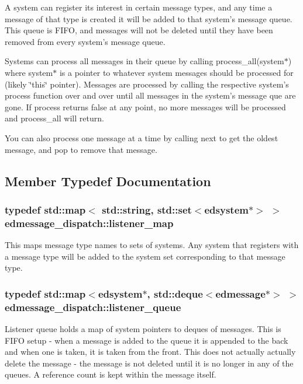 A system can register its interest in certain message types, and any time a message of that type is created it will be added to that system's message queue. This queue is F\-I\-F\-O, and messages will not be deleted until they have been removed from every system's message queue.

Systems can process all messages in their queue by calling process\-\_\-all(system$\ast$) where system$\ast$ is a pointer to whatever system messages should be processed for (likely \char`\"{}this\char`\"{} pointer). Messages are processed by calling the respective system's process function over and over until all messages in the system's message que are gone. If process returns false at any point, no more messages will be processed and process\-\_\-all will return.

You can also process one message at a time by calling next to get the oldest message, and pop to remove that message. 

\subsection{Member Typedef Documentation}
\hypertarget{classedmessage__dispatch_a6fca76f17817a3296ed712c8a2cc52d1}{
\subsubsection[{listener\-\_\-map}]{\setlength{\rightskip}{0pt plus 5cm}typedef std\-::map$<$ std\-::string, std\-::set$<${\bf edsystem}$\ast$$>$ $>$ {\bf edmessage\-\_\-dispatch\-::listener\-\_\-map}}}\label{classedmessage__dispatch_a6fca76f17817a3296ed712c8a2cc52d1}
This maps message type names to sets of systems. Any system that registers with a message type will be added to the system set corresponding to that message type. \hypertarget{classedmessage__dispatch_a4e1b44916d32280f02e952e0e41774bc}{
\subsubsection[{listener\-\_\-queue}]{\setlength{\rightskip}{0pt plus 5cm}typedef std\-::map$<${\bf edsystem}$\ast$, std\-::deque$<${\bf edmessage}$\ast$$>$ $>$ {\bf edmessage\-\_\-dispatch\-::listener\-\_\-queue}}}\label{classedmessage__dispatch_a4e1b44916d32280f02e952e0e41774bc}
Listener queue holds a map of system pointers to deques of messages. This is F\-I\-F\-O setup -\/ when a message is added to the queue it is appended to the back and when one is taken, it is taken from the front. This does not actually actually delete the message -\/ the message is not deleted until it is no longer in any of the queues. A reference count is kept within the message itself. 

